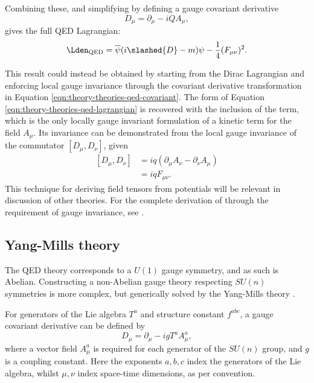 Combining these, and simplifying by defining a gauge covariant derivative
\begin{equation}
  D_\mu = \partial_\mu - iQA_\mu,
  \label{eqn:theory-theories-qed-covariant}
\end{equation}
gives the full \ac{QED} Lagrangian:
%
\begin{equation*}
  \LQED = \overline{\psi}(i\slashed{D} - m)\psi
                   - \frac14 (F_{\mu\nu})^2.
  \label{eqn:theory-theories-qed-lagrangian}
\end{equation*}

This result could instead be obtained by starting from the Dirac Lagrangian and
enforcing local gauge invariance through the covariant derivative transformation
in Equation \ref{eqn:theory-theories-qed-covariant}. The form of Equation
\ref{eqn:theory-theories-qed-lagrangian} is recovered with the inclusion of the
\LEM term, which is the only locally gauge invariant formulation of a kinetic
term for the field $A_\mu$. Its invariance can be demonstrated from the local
gauge invariance of the commutator $[D_\mu,D_\nu]$, given
\begin{equation}
  \begin{split}
    [D_\mu,D_\nu] &= iq(\partial_\mu A_\nu - \partial_\nu A_\mu)\\
                  &= iqF_{\mu\nu}.
  \end{split}
  \label{eqn:theory-theories-qed-covariant-commutator}
\end{equation}
%
This technique for deriving field tensors from potentials will be relevant in
discussion of other theories. For the complete derivation of \LQED through the
requirement of gauge invariance, see \cite[pp.482-6]{Peskin1995}.

%

\subsection{Yang-Mills theory}

The \ac{QED} theory corresponds to a $U(1)$ gauge symmetry, and
as such is Abelian. Constructing a non-Abelian gauge theory respecting $SU(n)$
symmetries is more complex, but generically solved by the Yang-Mills theory
\cite{Yang1954}.

For generators of the Lie algebra $T^a$ and structure constant $f^{abc}$,
a gauge covariant derivative can be defined by
\begin{equation*}
  D_\mu = \partial_\mu - igT^a A^a_\mu,
\end{equation*}
where a vector field $A^a_\mu$ is required for each generator of the $SU(n)$
group, and $g$ is a coupling constant. Here the exponents $a,b,c$ index the
generators of the Lie algebra, whilst $\mu,\nu$ index space-time dimensions, as
per convention. 

